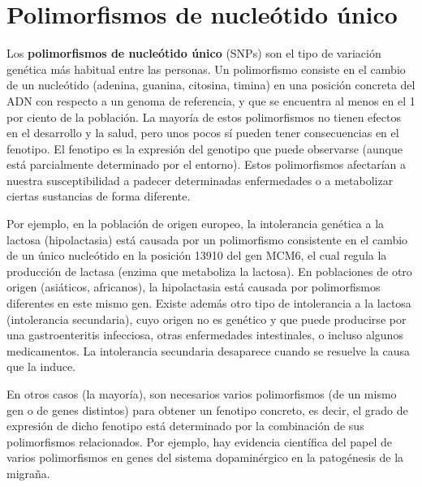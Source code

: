 \documentclass[a4paper,10pt]{article}
\begin{document}
\section*{Polimorfismos de nucleótido único}
%
Los \textbf{polimorfismos de nucleótido único} (SNPs) son el tipo de
variación genética más habitual entre las personas. Un polimorfismo
consiste en el cambio de un nucleótido (adenina, guanina, citosina,
timina) en una posición concreta del ADN con respecto a un genoma de
referencia, y que se encuentra al menos en el 1 por ciento de la
población. La mayoría de estos polimorfismos no tienen efectos en el
desarrollo y la salud, pero unos pocos sí pueden tener consecuencias
en el fenotipo. El fenotipo es la expresión del genotipo que puede
observarse (aunque está parcialmente determinado por el
entorno). Estos polimorfismos afectarían a nuestra susceptibilidad a
padecer determinadas enfermedades o a metabolizar ciertas sustancias
de forma diferente.

Por ejemplo, en la población de origen europeo, la intolerancia genética a la lactosa (hipolactasia) está causada por un polimorfismo consistente en el cambio de un único nucleótido en la posición 13910 del gen MCM6, el cual regula la producción de lactasa (enzima que metaboliza la lactosa). En poblaciones de otro origen (asiáticos, africanos), la hipolactasia está causada por  polimorfismos diferentes en este mismo gen. Existe además otro tipo de intolerancia a la lactosa (intolerancia secundaria), cuyo origen no es genético y que puede producirse por una gastroenteritis infecciosa, otras enfermedades intestinales, o incluso algunos medicamentos. La intolerancia secundaria desaparece cuando se resuelve la causa que la induce.

En otros casos (la mayoría), son necesarios varios polimorfismos (de un mismo gen o de genes distintos) para obtener un fenotipo concreto, es decir, el grado de expresión de dicho fenotipo está determinado por la combinación de sus polimorfismos relacionados. Por ejemplo, hay evidencia científica del papel de varios polimorfismos en genes del sistema dopaminérgico en la patogénesis de la migraña.
\end{document}
